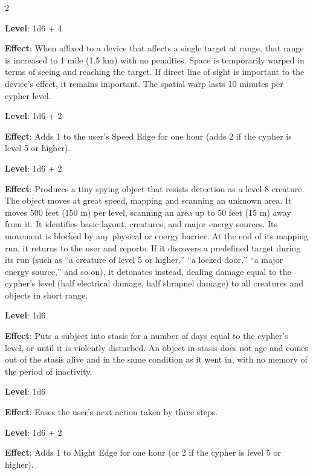 \begin{multicols}{2}

\textbf{Level}: 1d6 + 4

\textbf{Effect}: When affixed to a device that affects a single target at range, that range is increased to 1 mile (1.5 km) with no penalties. Space is temporarily warped in terms of seeing and reaching the target. If direct line of sight is important to the device’s effect, it remains important. The spatial warp lasts 10 minutes per cypher level.


\textbf{Level}: 1d6 + 2

\textbf{Effect}: Adds 1 to the user’s Speed Edge for one hour (adds 2 if the cypher is level 5 or higher).


\textbf{Level}: 1d6 + 2

\textbf{Effect}: Produces a tiny spying object that resists detection as a level 8 creature. The object moves at great speed, mapping and scanning an unknown area. It moves 500 feet (150 m) per level, scanning an area up to 50 feet (15 m) away from it. It identifies basic layout, creatures, and major energy sources. Its movement is blocked by any physical or energy barrier. At the end of its mapping run, it returns to the user and reports. If it discovers a predefined target during its run (such as “a creature of level 5 or higher,” “a locked door,” “a major energy source,” and so on), it detonates instead, dealing damage equal to the cypher’s level (half electrical damage, half shrapnel damage) to all creatures and objects in short range.


\textbf{Level}: 1d6

\textbf{Effect}: Puts a subject into stasis for a number of days equal to the cypher’s level, or until it is violently disturbed. An object in stasis does not age and comes out of the stasis alive and in the same condition as it went in, with no memory of the period of inactivity.


\textbf{Level}: 1d6

\textbf{Effect}: Eases the user’s next action taken by three steps.


\textbf{Level}: 1d6 + 2

\textbf{Effect}: Adds 1 to Might Edge for one hour (or 2 if the cypher is level 5 or higher).


\end{multicols}
